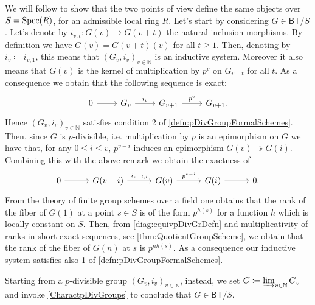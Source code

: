 \begin{rem}
	We will follow \cite[Chapter I, \S2, remark 2.3 and 
	Chapter II, \S3, theorem 2.1.7]{Messing} to show that
	the two points of view define the same objects over $S = \operatorname{Spec}(R)$,
	for an admissible local ring $R$.
	Let's start by considering $G \in \mathsf{BT}/S$.
	Let's denote by $i_{v,t}\colon G(v) \to G(v+t)$ the natural inclusion
	morphisms.
	By definition we have $G(v) = G(v+t)(v)$ for all $t \geq 1$.
	Then, denoting by $i_v \coloneqq i_{v,1}$, this means that
	$\left( G_v, i_v \right)_{v \in \mathbb{N}}$ is an inductive system.
	Moreover it also means that $G(v)$ is the kernel of multiplication
	by $p^v$ on $G_{v+t}$ for all $t$. 
	As a consequence we obtain that the following sequence is exact:
	\begin{equation*}
	\begin{tikzcd}
		0 \arrow[r, "", rightarrow] &
		G_v \arrow[r, "i_v", rightarrow] &
		G_{v+1} \arrow[r, "p^v", rightarrow] &
		G_{v+1}
	.\end{tikzcd}
	\end{equation*}
	Hence $\left( G_v, i_v \right)_{v \in \mathbb{N}}$ satisfies condition 2
	of \cref{defn:pDivGroupFormalSchemes}.
	Then, since $G$ is $p$-divisible, i.e. multiplication by $p$ is an
	epimorphism on $G$ we have that, for any $0 \leq i \leq v$,
	$p^{v-i}$ induces an epimorphism $G(v) \twoheadrightarrow G(i)$.
	Combining this with the above remark we obtain the exactness of
	\begin{equation}\label{diag:equivpDivGrDefn}
	\begin{tikzcd}[column sep=2.9em]
		0 \arrow[r, "", rightarrow] &
		G(v-i) \arrow[r, "i_{v-i,i}", rightarrow] &
		G(v) \arrow[r, "p^{v-i}", rightarrow] &
		G(i) \arrow[r, "", rightarrow] &
		0
	.\end{tikzcd}
	\end{equation}
	From the theory of finite group schemes over a field one obtains that the
	rank of the fiber of $G(1)$ at a point $s \in S$ is of the form
	$p^{h(s)}$ for a function $h$ which is locally constant on $S$.
	Then, from \cref{diag:equivpDivGrDefn} and multiplicativity of
	ranks in short exact sequences, see \cref{thm:QuotientGroupScheme}, we obtain
	that the rank of the fiber of $G(n)$ at $s$
	is $p^{nh(s)}$.
	As a consequence our inductive system satisfies also 1
	of \cref{defn:pDivGroupFormalSchemes}.

	Starting from a $p$-divisible group $\left( G_v, i_v \right)_{v \in \mathbb{N}}$,
	instead, we set $G \coloneqq \varinjlim_{v \in \mathbb{N}} G_v$
	and invoke \cref{CharactpDivGroups} to conclude that $G \in \mathsf{BT}/S$.
\end{rem}

